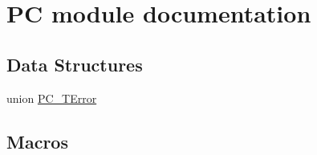 \hypertarget{group___p_c__module}{\section{P\-C module documentation}
\label{group___p_c__module}
}
\subsection*{Data Structures}
\begin{DoxyCompactItemize}
\item 
union \hyperlink{union_p_c___t_error}{P\-C\-\_\-\-T\-Error}
\end{DoxyCompactItemize}
\subsection*{Macros}
